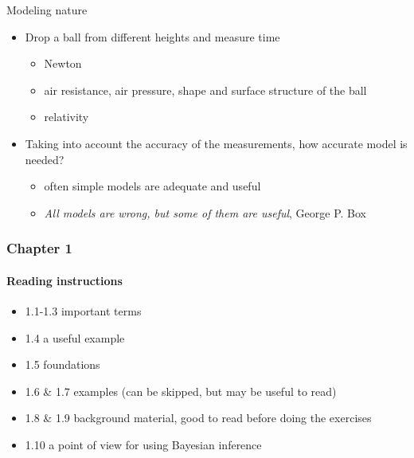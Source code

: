 \documentclass[english,t]{beamer}
\begin{document}
\begin{frame}{Modeling nature}

  \begin{itemize}
  \item Drop a ball from different heights and measure time
    \pause
    \begin{itemize}
    \item Newton
    \item air resistance, air pressure, shape and surface structure of the ball
    \item relativity
    \end{itemize}
    \pause
  \item Taking into account the accuracy of the measurements, how
    accurate model is needed?
    \pause
    \begin{itemize}
    \item often simple models are adequate and useful
    \item \emph{All models are wrong, but some of them are useful},
      George P. Box
    \end{itemize}
  \end{itemize}

\end{frame}

\begin{frame}
  \frametitle{Chapter 1}  %
  \framesubtitle{Reading instructions}
  \begin{itemize}
\item 1.1-1.3 important terms
\item 1.4 a useful example
\item 1.5 foundations
\item 1.6 \& 1.7 examples (can be skipped, but may be useful to read)
\item 1.8 \& 1.9 background material, good to read before doing the exercises
\item 1.10 a point of view for using Bayesian inference
  \end{itemize}

\end{frame}
\end{document}
